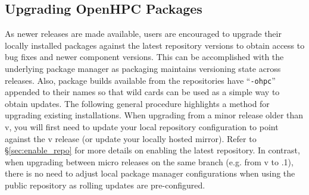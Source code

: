 \subsection{Upgrading OpenHPC Packages}  \label{appendix:upgrade}


As newer \OHPC{} releases are made available, users are encouraged to upgrade
their locally installed packages against the latest repository versions to
obtain access to bug fixes and newer component versions. This can be
accomplished with the underlying package manager as \OHPC{} packaging maintains
versioning state across releases. Also, package builds available from the
\OHPC{} repositories have ``\texttt{-ohpc}'' appended to their names so that
wild cards can be used as a simple way to obtain updates. The following general
procedure highlights a method for upgrading existing installations.
When upgrading from a minor release older than v\OHPCVerTree{}, you will first
need to update your local \OHPC{} repository configuration to point against the
v\OHPCVerTree{} release (or update your locally hosted mirror). Refer to
\S\ref{sec:enable_repo} for more details on enabling the latest
repository. In contrast, when upgrading between micro releases on the same
branch (e.g. from v\OHPCVerTree{} to \OHPCVerTree{}.1), there is no need to
adjust local package manager configurations when using the public repository as
rolling updates are pre-configured.
 
